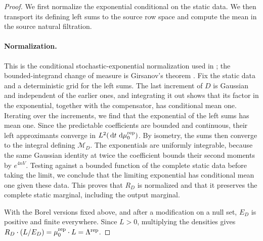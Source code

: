 \begin{proof}
We first normalize the exponential conditional on the static data.
We then transport its defining left sums to the source row space and
compute the mean in the source natural filtration.

\paragraph{Normalization.}
This is the conditional stochastic-exponential normalization used in
\cite[Section~4, proof of Proposition~5]{oai-typical-upper}; the
bounded-integrand change of measure is Girsanov's theorem
\cite[Theorem~3.5.1]{karatzas-shreve-1991}.
Fix the static data and a deterministic grid for the left sums. The last
increment of $D$ is Gaussian and independent of the earlier ones, and
integrating it out shows that its factor in the exponential, together with
the compensator, has conditional mean one. Iterating over the increments, we find
that the exponential of the left sums has mean one. Since the predictable
coefficients are bounded and continuous, their left approximants
converge in $L^2(\,\mathrm d t\,\,\mathrm d\mu^{\rm rep}_0)$. By isometry, the sums
then converge to the integral defining $\mathscr M_D$. The exponentials are uniformly
integrable, because the same Gaussian identity at twice the coefficient
bounds their second moments by $e^{4nV}$. Testing against a bounded
function of the complete static data before taking the limit, we
conclude that the limiting exponential has conditional mean one given
these data.
This proves that $R_D$ is normalized and that it preserves the
complete static marginal, including the output marginal.

With the Borel versions fixed above, and after a modification on a null set,
$E_D$ is positive and finite everywhere.
Since $L>0$, multiplying the densities gives
$R_D\cdot(L/E_D)=\mu^{\rm rep}_0\cdot L=\Lambda^{\rm rep}$.


\end{proof}
